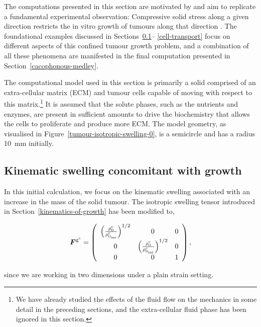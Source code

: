 The computations presented in this section are motivated by and aim to
replicate a fundamental experimental observation: Compressive solid
stress along a given direction restricts the in vitro growth of
tumours along that direction \citep{jain1997}. The foundational
examples discussed in Sections~\ref{tumour-isotropic-swelling}--%
\ref{cell-transport} focus on different aspects of this confined
tumour growth problem, and a combination of all these phenomena are
manifested in the final computation presented in
Section~\ref{cacophonous-medley}.

The computational model used in this section is primarily a solid
comprised of an extra-cellular matrix (ECM) and tumour cells capable
of moving with respect to this matrix.\footnote{We have already
  studied the effects of the fluid flow on the mechanics in some
  detail in the preceding sections, and the extra-cellular fluid phase
  has been ignored in this section.} It is assumed that the solute
phases, such as the nutrients and enzymes, are present in sufficient
amounts to drive the biochemistry that allows the cells to proliferate
and produce more ECM. The model geometry, as visualised in
Figure~\ref{tumour-isotropic-swelling-0}, is a semicircle and has a
radius 10~mm initially.

\subsection{Kinematic swelling concomitant with growth}
\label{tumour-isotropic-swelling}

In this initial calculation, we focus on the kinematic swelling
associated with an increase in the mass of the solid tumour. The
isotropic swelling tensor introduced in
Section~\ref{kinematics-of-growth} has been modified to,

\begin{equation}
\mbox{\boldmath$ F$}^{\mathrm{g}^{\mathrm{c}}} = \left(
\begin{array}{ccc}
\left(\frac{\rho_0^{\mathrm{c}}}
     {\rho_{0_{\mathrm{ini}}}^{\mathrm{c}}}\right)^{1/2} & 0 & 0 \\ 0
     & \left(\frac{\rho_0^{\mathrm{c}}}
     {\rho_{0_{\mathrm{ini}}}^{\mathrm{c}}}\right)^{1/2} & 0 \\ 0 & 0
     & 1 \end{array} \right),
\end{equation}

\noindent since we are working in two dimensions under a plain strain
setting.

